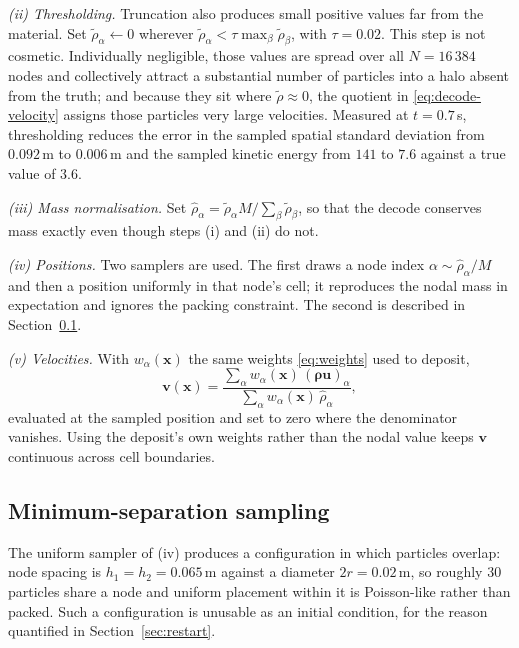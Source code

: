 \documentclass[11pt]{article}
\newcommand{\bs}[1]{\boldsymbol{#1}}
\begin{document}
\emph{(ii) Thresholding.} Truncation also produces small positive values far from the material. Set
$\tilde{\rho}_\alpha \leftarrow 0$ wherever $\tilde{\rho}_\alpha < \tau \max_\beta
\tilde{\rho}_\beta$, with $\tau = 0.02$. This step is not cosmetic. Individually negligible, those
values are spread over all $N = 16\,384$ nodes and collectively attract a substantial number of
particles into a halo absent from the truth; and because they sit where $\tilde{\rho} \approx 0$, the
quotient in \eqref{eq:decode-velocity} assigns those particles very large velocities. Measured at
$t = 0.7$\,s, thresholding reduces the error in the sampled spatial standard deviation from
$0.092$\,m to $0.006$\,m and the sampled kinetic energy from $141$ to $7.6$ against a true value of
$3.6$.

\emph{(iii) Mass normalisation.} Set $\hat{\rho}_\alpha = \tilde{\rho}_\alpha M / \sum_\beta
\tilde{\rho}_\beta$, so that the decode conserves mass exactly even though steps (i) and (ii) do not.

\emph{(iv) Positions.} Two samplers are used. The first draws a node index
$\alpha \sim \hat{\rho}_\alpha / M$ and then a position uniformly in that node's cell; it reproduces
the nodal mass in expectation and ignores the packing constraint. The second is described in
Section~\ref{sec:poisson}.

\emph{(v) Velocities.} With $w_\alpha(\bs{x})$ the same weights \eqref{eq:weights} used to deposit,
\begin{equation}
  \bs{v}(\bs{x}) = \frac{\sum_\alpha w_\alpha(\bs{x}) \, (\bs{\rho u})_\alpha}
  {\sum_\alpha w_\alpha(\bs{x}) \, \hat{\rho}_\alpha},
  \label{eq:decode-velocity}
\end{equation}
evaluated at the sampled position and set to zero where the denominator vanishes. Using the deposit's
own weights rather than the nodal value keeps $\bs{v}$ continuous across cell boundaries.

\subsection{Minimum-separation sampling}
\label{sec:poisson}

The uniform sampler of (iv) produces a configuration in which particles overlap: node spacing is
$h_1 = h_2 = 0.065$\,m against a diameter $2r = 0.02$\,m, so roughly $30$ particles share a node and
uniform placement within it is Poisson-like rather than packed. Such a configuration is unusable as an
initial condition, for the reason quantified in Section~\ref{sec:restart}.
\end{document}
